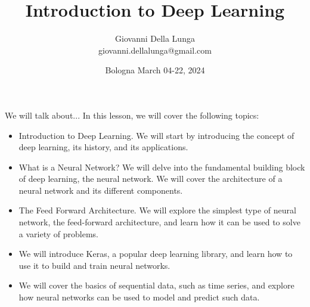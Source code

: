 \documentclass[11pt]{beamer}
\author{Giovanni Della Lunga\\{\footnotesize giovanni.dellalunga@gmail.com}}
\title{Introduction to Deep Learning}
\subtitle{} %
\institute{ADVANCED TOPICS IN ARTIFICIAL INTELLIGENCE}
\date{Bologna March 04-22, 2024}
\begin{document}
\begin{frame}
\titlepage
\end{frame}

\AtBeginSubsection{\frame{\subsectionpage}}


\begin{frame}{We will talk about...}
In this lesson, we will cover the following topics:
\begin{itemize}
\item Introduction to Deep Learning. We will start by introducing the concept of deep learning, its history, and its applications.
\item What is a Neural Network? We will delve into the fundamental building block of deep learning, the neural network. We will cover the architecture of a neural network and its different components.
\item The Feed Forward Architecture. We will explore the simplest type of neural network, the feed-forward architecture, and learn how it can be used to solve a variety of problems. 
\item  We will introduce Keras, a popular deep learning library, and learn how to use it to build and train neural networks.
\item We will cover the basics of sequential data, such as time series, and explore how neural networks can be used to model and predict such data.
\end{itemize}
\end{frame}
\end{document}

